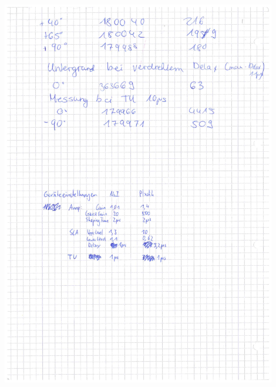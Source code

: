 \documentclass[12pt,listof=totoc]{scrartcl}
\begin{document}
\begin{minipage}{\textwidth}
	\centering
	\includegraphics[width=0.9\textwidth]{figures/Laborheft2.pdf}
\end{minipage}
\label{Laborbuch}
\newpage
\listoffigures

\end{document}

